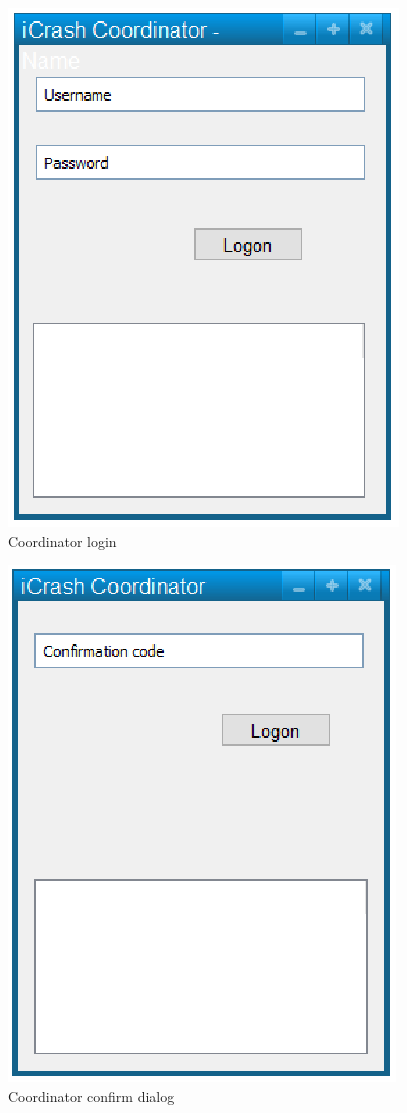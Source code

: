 \begin{figure}
  \centering
    \includegraphics{images/mockups/feature1-login/CoordinatorLogon.eps}
  \caption{Coordinator login}
  \label{fig:CoordinatorLogin}
\end{figure}


\begin{figure}
  \centering
    \includegraphics{images/mockups/feature1-login/CoordinatorConfirm.eps}
  \caption{Coordinator confirm dialog}
  \label{fig:CoordinatorConfirm}
\end{figure}
